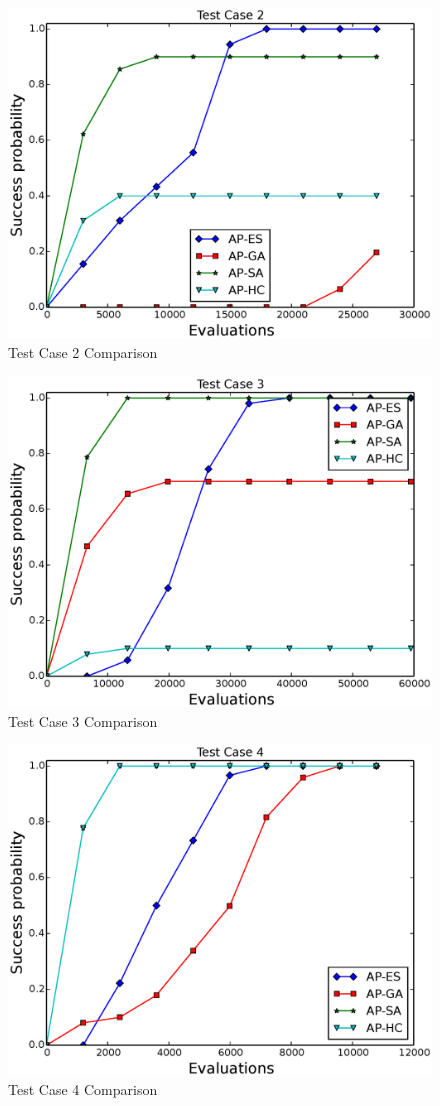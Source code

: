 \documentclass{sig-alternate}
\begin{document}
\begin{figure}
    \begin{center}
        \includegraphics[width=.49\textwidth]{FIG/tc2_sp.eps}
\end{center}
\caption{Test Case 2 Comparison}
\label{fig:tc2_sp}
\end{figure}

\begin{figure}
    \begin{center}
        \includegraphics[width=.49\textwidth]{FIG/tc3_sp.eps}
\end{center}
\caption{Test Case 3 Comparison}
\label{fig:tc3_sp}
\end{figure}

\begin{figure}
    \begin{center}
        \includegraphics[width=.49\textwidth]{FIG/tc4_sp.eps}
\end{center}
\caption{Test Case 4 Comparison}
\label{fig:tc4_sp}
\end{figure}
\end{document}
